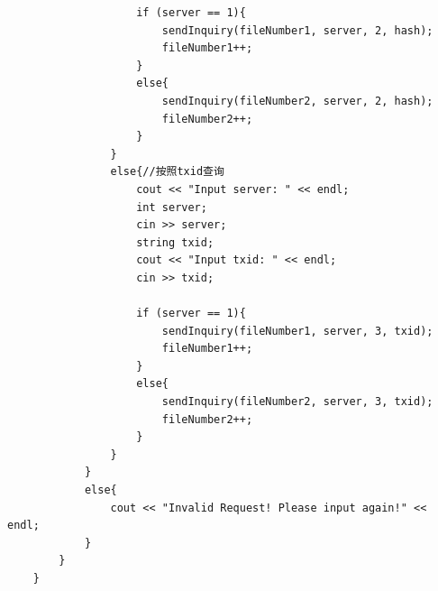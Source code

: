 \documentclass[10pt,a4paper]{article}
\begin{document}
\begin{verbatim}
                    if (server == 1){
                        sendInquiry(fileNumber1, server, 2, hash);
                        fileNumber1++;
                    }
                    else{
                        sendInquiry(fileNumber2, server, 2, hash);
                        fileNumber2++;
                    }
                }
                else{//按照txid查询
                    cout << "Input server: " << endl;
                    int server;
                    cin >> server;
                    string txid;
                    cout << "Input txid: " << endl;
                    cin >> txid;
                    
                    if (server == 1){
                        sendInquiry(fileNumber1, server, 3, txid);
                        fileNumber1++;
                    }
                    else{
                        sendInquiry(fileNumber2, server, 3, txid);
                        fileNumber2++;
                    }
                }
            }
            else{
                cout << "Invalid Request! Please input again!" << endl;
            }
        }
    }
    \end{verbatim}
\end{document}
